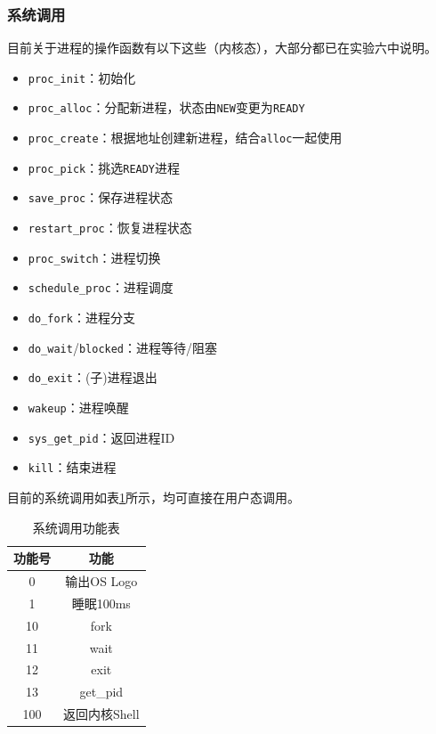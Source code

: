 \documentclass[logo,reportComp]{thesis}
\begin{document}
\subsubsection{系统调用}
目前关于进程的操作函数有以下这些（内核态），大部分都已在实验六中说明。
\begin{itemize}
	\item \verb'proc_init'：初始化
	\item \verb'proc_alloc'：分配新进程，状态由\verb'NEW'变更为\verb'READY'
	\item \verb'proc_create'：根据地址创建新进程，结合\verb'alloc'一起使用
	\item \verb'proc_pick'：挑选\verb'READY'进程
	\item \verb'save_proc'：保存进程状态
	\item \verb'restart_proc'：恢复进程状态
	\item \verb'proc_switch'：进程切换
	\item \verb'schedule_proc'：进程调度
	\item \verb'do_fork'：进程分支
	\item \verb'do_wait'/\verb'blocked'：进程等待/阻塞
	\item \verb'do_exit'：(子)进程退出
	\item \verb'wakeup'：进程唤醒
	\item \verb'sys_get_pid'：返回进程ID
	\item \verb'kill'：结束进程
\end{itemize}

目前的系统调用如表\ref{tab:syscall}所示，均可直接在用户态调用。
\begin{table}[H]
\caption{系统调用功能表}
\label{tab:syscall}
\centering
\begin{tabular}{|c|c|}\hline
\textbf{功能号} & \textbf{功能}\\\hline
0 & 输出OS Logo\\\hline
1 & 睡眠100ms\\\hline
10 & fork\\\hline
11 & wait\\\hline
12 & exit\\\hline
13 & get\_pid\\\hline
100 & 返回内核Shell\\\hline
\end{tabular}
\end{table}
\end{document}
